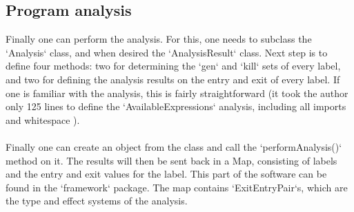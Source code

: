 \documentclass[paper=a4, fontsize=11pt]{scrartcl} %
\numberwithin{equation}{section} %
\numberwithin{figure}{section} %
\numberwithin{table}{section} %
\begin{document}
\subsection{Program analysis}

Finally one can perform the analysis.
For this, one needs to subclass the `Analysis` class, and when desired the `AnalysisResult` class.
Next step is to define four methods: two for determining the `gen` and `kill` sets of every label, and two for defining the analysis results on the entry and exit of every label.
If one is familiar with the analysis, this is fairly straightforward (it took the author only 125 lines to define the `AvailableExpressions` analysis, including all imports and whitespace \cite{ar}).
\\
\\
Finally one can create an object from the class and call the `performAnalysis()` method on it.
The results will then be sent back in a Map, consisting of labels and the entry and exit values for the label.
This part of the software can be found in the `framework` package. The map contains `ExitEntryPair`s, which are the type and effect systems of the analysis.




\end{document}
